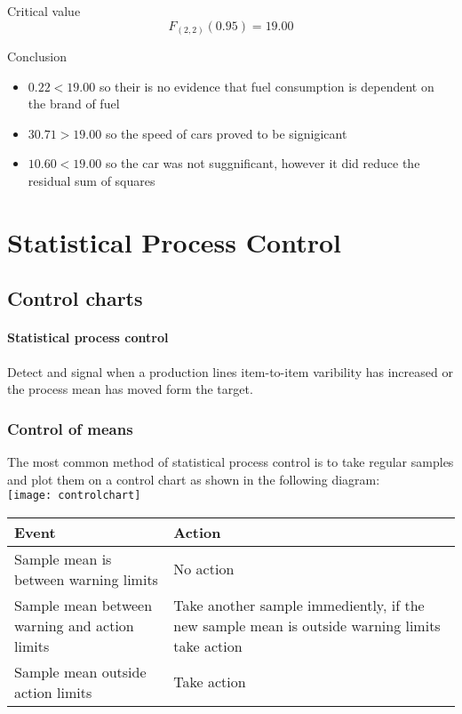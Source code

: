 \begin{example}
        \begin{step}{Critical value}
        $$
        F_{(2, 2)}(0.95) = 19.00
        $$
        \end{step}

        \begin{step}{Conclusion}
        \begin{itemize}
        \item $0.22 < 19.00$ so their is no evidence that fuel consumption is dependent on the brand of fuel
        \item $30.71 > 19.00$ so the speed of cars proved to be signigicant
        \item $10.60 < 19.00$ so the car was not suggnificant, however it did reduce the residual sum of squares 
        \end{itemize}
        \end{step}

        \end{example}

\newpage
\section{Statistical Process Control}
    
    \newpage
    \subsection{Control charts}
        \paragraph{Statistical process control}
        Detect and signal when a production lines item-to-item varibility has increased or the process mean has moved form the target.

    \subsubsection{Control of means}
        The most common method of statistical process control is to take regular samples and plot them on a control chart as shown in the following diagram:\\
        \texttt{[image: controlchart]}

        \begin{center}
        \begin{tabularx}{\textwidth}{l|X}
        Event & Action \\
        \hline
        Sample mean is between warning limits & No action \\
        Sample mean between warning and action limits & Take another sample immediently, if the new sample mean is outside warning limits take action \\
        Sample mean outside action limits & Take action \\
        \end{tabularx}
        \end{center}


